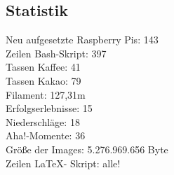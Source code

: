 \subsection{Statistik}\label{fz_statistik}
Neu aufgesetzte Raspberry Pis: 143\\
Zeilen Bash-Skript: 397\\
Tassen Kaffee: 41\\
Tassen Kakao: 79\\
Filament: 127,31m\\
Erfolgserlebnisse: 15\\
Niederschläge: 18\\
Aha!-Momente: 36\\
Größe der Images: 5.276.969.656 Byte\\
Zeilen \LaTeX - Skript: alle!\\ 